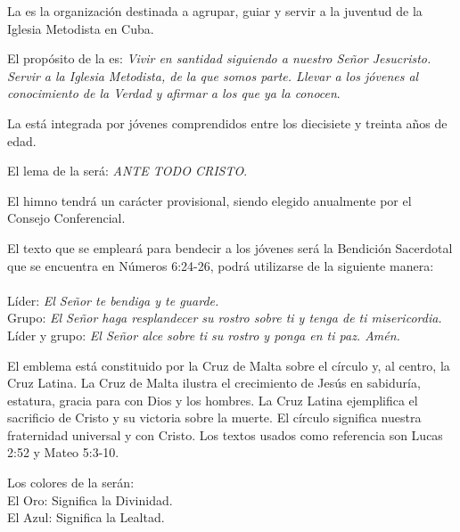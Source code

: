 

\article
\label{definicion-liga}
La \LMJ{} es la organización destinada a agrupar, guiar y servir a la juventud de la Iglesia Metodista en Cuba.

\article
\label{proposito-liga}
El propósito de la \LMJ{} es: \emph{Vivir en santidad siguiendo a nuestro Señor Jesucristo. Servir a la Iglesia Metodista, de la que somos parte. Llevar a los jóvenes al conocimiento de la Verdad y afirmar a los que ya la conocen}.

\article
\label{composicion-liga}
La \LMJ{} está integrada por jóvenes comprendidos entre los diecisiete y treinta años de edad.

\article
El lema de la \LMJ{} será: \emph{ANTE TODO CRISTO}.

\article
El himno tendrá un carácter provisional, siendo elegido anualmente por el Consejo Conferencial.

\article
\label{texto-liga}
El texto que se empleará para bendecir a los jóvenes será la Bendición Sacerdotal que se encuentra en Números 6:24-26, podrá utilizarse de la siguiente manera:\\ \\
Líder: \emph{El Señor te bendiga y te guarde.}\\
Grupo: \emph{El Señor haga resplandecer su rostro sobre ti y tenga de ti misericordia.}\\
Líder y grupo: \emph{El Señor alce sobre ti su rostro y ponga en ti paz. Amén.}

\article
\label{emblema-liga}
El emblema está constituido por la Cruz de Malta sobre el círculo y, al centro, la Cruz Latina. La Cruz de Malta ilustra el crecimiento de Jesús en sabiduría, estatura, gracia para con Dios y los hombres. La Cruz Latina ejemplifica el sacrificio de Cristo y su victoria sobre la muerte. El círculo significa nuestra fraternidad universal y con Cristo. Los textos usados como referencia son Lucas 2:52 y Mateo 5:3-10.

\article
Los colores de la \LMJ{} serán:\\
El Oro: Significa la Divinidad.\\
El Azul: Significa la Lealtad.
